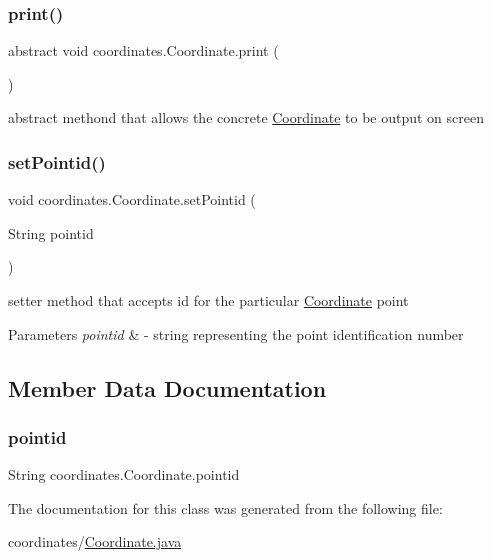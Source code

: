 \subsubsection{\texorpdfstring{print()}{print()}}
{\footnotesize\ttfamily abstract void coordinates.\+Coordinate.\+print (\begin{DoxyParamCaption}{ }\end{DoxyParamCaption})\hspace{0.3cm}{\ttfamily [abstract]}}



abstract methond that allows the concrete \hyperlink{classcoordinates_1_1_coordinate}{Coordinate} to be output on screen 

\mbox{\label{classcoordinates_1_1_coordinate_a14f00383b5a41df79220112a12ef1cbf}} 
\subsubsection{\texorpdfstring{set\+Pointid()}{setPointid()}}
{\footnotesize\ttfamily void coordinates.\+Coordinate.\+set\+Pointid (\begin{DoxyParamCaption}\item[{String}]{pointid }\end{DoxyParamCaption})}



setter method that accepts id for the particular \hyperlink{classcoordinates_1_1_coordinate}{Coordinate} point 


\begin{DoxyParams}{Parameters}
{\em pointid} & -\/ string representing the point identification number \\
\hline
\end{DoxyParams}


\subsection{Member Data Documentation}
\mbox{\label{classcoordinates_1_1_coordinate_a871c4eb3e8771b3e59f26c8e573d6aa0}} 
\subsubsection{\texorpdfstring{pointid}{pointid}}
{\footnotesize\ttfamily String coordinates.\+Coordinate.\+pointid\hspace{0.3cm}{\ttfamily [private]}}



The documentation for this class was generated from the following file\+:\begin{DoxyCompactItemize}
\item 
coordinates/\hyperlink{_coordinate_8java}{Coordinate.\+java}\end{DoxyCompactItemize}
